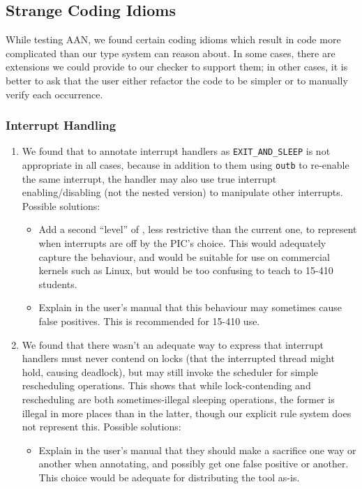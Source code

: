 \documentclass{article}
\begin{document}
\subsection{Strange Coding Idioms}

While testing AAN, we found certain coding idioms which result in code more complicated than our type system can reason about. In some cases, there are extensions we could provide to our checker to support them; in other cases, it is better to ask that the user either refactor the code to be simpler or to manually verify each occurrence.

\subsubsection{Interrupt Handling}

\begin{enumerate}
	\item
		We found that to annotate interrupt handlers as \texttt{EXIT\_AND\_SLEEP} is not appropriate in all cases, because in addition to them using \texttt{outb} to re-enable the same interrupt, the handler may also use true interrupt enabling/disabling (not the nested version) to manipulate other interrupts. Possible solutions:
		\begin{itemize}
			\item Add a second ``level'' of \Infinity, less restrictive than the current one, to represent when interrupts are off by the PIC's choice.
				This would adequately capture the behaviour, and would be suitable for use on commercial kernels such as Linux, but would be too confusing to teach to 15-410 students.
			\item Explain in the user's manual that this behaviour may sometimes cause false positives. This is recommended for 15-410 use.
		\end{itemize}
	\item
		We found that there wasn't an adequate way to express that interrupt handlers must never contend on locks (that the interrupted thread might hold, causing deadlock), but may still invoke the scheduler for simple rescheduling operations.
		This shows that while lock-contending and rescheduling are both sometimes-illegal sleeping operations, the former is illegal in more places than in the latter, though our explicit rule system does not represent this.
		Possible solutions:
		\begin{itemize}
			\item Explain in the user's manual that they should make a sacrifice one way or another when annotating, and possibly get one false positive or another. This choice would be adequate for distributing the tool as-is.

\end{itemize}
\end{enumerate}
\end{document}
